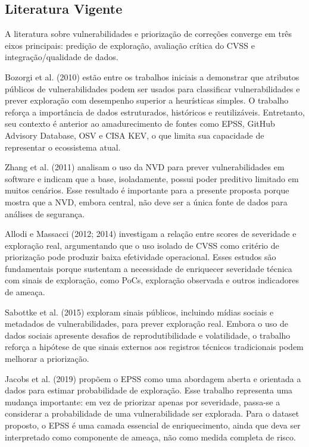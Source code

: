 \subsection{Literatura Vigente}

A literatura sobre vulnerabilidades e priorização de correções converge em três eixos principais: predição de exploração, avaliação crítica do CVSS e integração/qualidade de dados.

Bozorgi et al. (2010) estão entre os trabalhos iniciais a demonstrar que atributos públicos de vulnerabilidades podem ser usados para classificar vulnerabilidades e prever exploração com desempenho superior a heurísticas simples. O trabalho reforça a importância de dados estruturados, históricos e reutilizáveis. Entretanto, seu contexto é anterior ao amadurecimento de fontes como EPSS, GitHub Advisory Database, OSV e CISA KEV, o que limita sua capacidade de representar o ecossistema atual.

Zhang et al. (2011) analisam o uso da NVD para prever vulnerabilidades em software e indicam que a base, isoladamente, possui poder preditivo limitado em muitos cenários. Esse resultado é importante para a presente proposta porque mostra que a NVD, embora central, não deve ser a única fonte de dados para análises de segurança.

Allodi e Massacci (2012; 2014) investigam a relação entre scores de severidade e exploração real, argumentando que o uso isolado de CVSS como critério de priorização pode produzir baixa efetividade operacional. Esses estudos são fundamentais porque sustentam a necessidade de enriquecer severidade técnica com sinais de exploração, como PoCs, exploração observada e outros indicadores de ameaça.

Sabottke et al. (2015) exploram sinais públicos, incluindo mídias sociais e metadados de vulnerabilidades, para prever exploração real. Embora o uso de dados sociais apresente desafios de reprodutibilidade e volatilidade, o trabalho reforça a hipótese de que sinais externos aos registros técnicos tradicionais podem melhorar a priorização.

Jacobs et al. (2019) propõem o EPSS como uma abordagem aberta e orientada a dados para estimar probabilidade de exploração. Esse trabalho representa uma mudança importante: em vez de priorizar apenas por severidade, passa-se a considerar a probabilidade de uma vulnerabilidade ser explorada. Para o dataset proposto, o EPSS é uma camada essencial de enriquecimento, ainda que deva ser interpretado como componente de ameaça, não como medida completa de risco.

